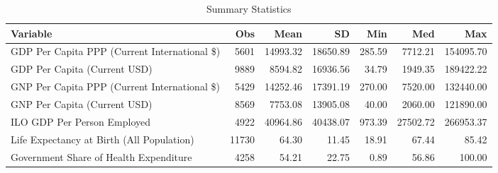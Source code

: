 \begin{table}
\centering
\caption{Summary Statistics}
\label{Sum_Stats}
\begin{tabular}{lrrrrrr}
\toprule
                                    Variable &   Obs &     Mean &       SD &    Min &      Med &       Max \\
\midrule
GDP Per Capita PPP (Current International \$) & 5601 & 14993.32 & 18650.89 & 285.59 & 7712.21 & 154095.70 \\
GDP Per Capita (Current USD) & 9889 & 8594.82 & 16936.56 & 34.79 & 1949.35 & 189422.22 \\
GNP Per Capita PPP (Current International \$) & 5429 & 14252.46 & 17391.19 & 270.00 & 7520.00 & 132440.00 \\
GNP Per Capita (Current USD) & 8569 & 7753.08 & 13905.08 & 40.00 & 2060.00 & 121890.00 \\
ILO GDP Per Person Employed & 4922 & 40964.86 & 40438.07 & 973.39 & 27502.72 & 266953.37 \\
Life Expectancy at Birth (All Population) & 11730 & 64.30 & 11.45 & 18.91 & 67.44 & 85.42 \\
Government Share of Health Expenditure & 4258 & 54.21 & 22.75 & 0.89 & 56.86 & 100.00 \\
\bottomrule
\end{tabular}
\end{table}
